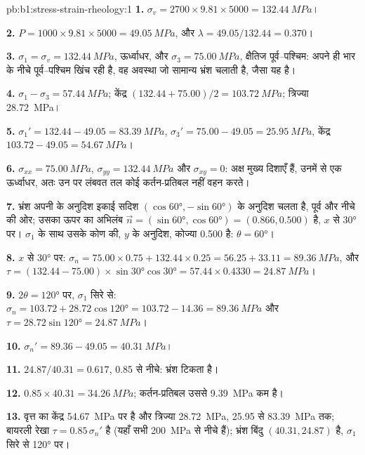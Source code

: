 \begin{solution}{pb:b1:stress-strain-rheology:1}
\textbf{1.} $\sigma_v = 2700\times9.81\times5000 = \qty{132.44}{MPa}$।

\textbf{2.} $P = 1000\times9.81\times5000 = \qty{49.05}{MPa}$, और
$\lambda = 49.05/132.44 = 0.370$।

\textbf{3.} $\sigma_1 = \sigma_v = \qty{132.44}{MPa}$, ऊर्ध्वाधर, और
$\sigma_3 = \qty{75.00}{MPa}$, क्षैतिज पूर्व–पश्चिम:  अपने ही भार के नीचे पूर्व–पश्चिम खिंच रही है, वह अवस्था जो सामान्य भ्रंश चलाती है, जैसा यह है।

\textbf{4.} $\sigma_1 - \sigma_3 = \qty{57.44}{MPa}$; केंद्र
$(132.44 + 75.00)/2 = \qty{103.72}{MPa}$; त्रिज्या \qty{28.72}{MPa}।

\textbf{5.} $\sigma_1' = 132.44 - 49.05 = \qty{83.39}{MPa}$, $\sigma_3' =
75.00 - 49.05 = \qty{25.95}{MPa}$, केंद्र $103.72 - 49.05 = \qty{54.67}{MPa}$।

\textbf{6.} $\sigma_{xx} = \qty{75.00}{MPa}$, $\sigma_{yy} = \qty{132.44}{MPa}$
और $\sigma_{xy} = 0$: अक्ष मुख्य दिशाएँ हैं, उनमें से एक ऊर्ध्वाधर, अतः उन पर लंबवत तल कोई कर्तन-प्रतिबल नहीं वहन करते।

\textbf{7.} भ्रंश अपनी  के अनुदिश इकाई सदिश
$(\cos\ang{60}, -\sin\ang{60})$ के अनुदिश चलता है, पूर्व और नीचे की ओर; उसका ऊपर का अभिलंब
$\vec n = (\sin\ang{60}, \cos\ang{60}) = (0.866, 0.500)$ है, $x$ से \ang{30} पर। $\sigma_1$ के साथ उसके कोण की, $y$ के अनुदिश, कोज्या
0.500 है: $\theta = \ang{60}$।

\textbf{8.} $x$ से \ang{30} पर: $\sigma_n = 75.00\times0.75 + 132.44\times0.25
= 56.25 + 33.11 = \qty{89.36}{MPa}$, और $\tau = (132.44 - 75.00)\times
\sin\ang{30}\cos\ang{30} = 57.44\times0.4330 = \qty{24.87}{MPa}$।

\textbf{9.} $2\theta = \ang{120}$ पर, $\sigma_1$ सिरे से:
$\sigma_n = 103.72 + 28.72\cos\ang{120} = 103.72 - 14.36 = \qty{89.36}{MPa}$
और $\tau = 28.72\sin\ang{120} = \qty{24.87}{MPa}$।

\textbf{10.} $\sigma_n' = 89.36 - 49.05 = \qty{40.31}{MPa}$।

\textbf{11.} $24.87/40.31 = 0.617$, 0.85 से नीचे: भ्रंश टिकता है।

\textbf{12.} $0.85\times40.31 = \qty{34.26}{MPa}$; कर्तन-प्रतिबल उससे
\qty{9.39}{MPa} कम है।

\textbf{13.} वृत्त का केंद्र \qty{54.67}{MPa} पर है और त्रिज्या
\qty{28.72}{MPa}, \num{25.95} से \qty{83.39}{MPa} तक; बायरली रेखा
$\tau = 0.85\,\sigma_n'$ है (यहाँ सभी  \qty{200}{MPa} से नीचे हैं); भ्रंश बिंदु $(40.31, 24.87)$ है, $\sigma_1$ सिरे से \ang{120} पर।


\end{solution}

